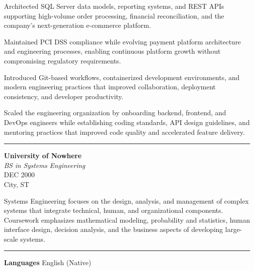 \documentclass[10pt]{article}
\newcommand{\sectionlabel}[1]{%
  \par\vspace{-8pt}%
  \noindent\textcolor{lightgray}{\rule{\textwidth}{0.3pt}}\par\vspace{-2pt}%
  \noindent{\bfseries\large #1}\par\vspace{-4pt}%
}
\newcommand{\edumeta}[4]{%
  \textbf{#2}\\[2pt]
  \textit{#1}\\[6pt]
  {\color{lighttext}#3}\\
  {\color{lighttext}#4}%
}
\begin{document}
\begin{entryrow}
\begin{resumeitems}
    \item Architected SQL Server data models, reporting systems, and REST APIs supporting high-volume order processing, financial reconciliation, and the company's next-generation e-commerce platform.
    \item Maintained PCI DSS compliance while evolving payment platform architecture and engineering processes, enabling continuous platform growth without compromising regulatory requirements.
    \item Introduced Git-based workflows, containerized development environments, and modern engineering practices that improved collaboration, deployment consistency, and developer productivity.
    \item Scaled the engineering organization by onboarding backend, frontend, and DevOps engineers while establishing coding standards, API design guidelines, and mentoring practices that improved code quality and accelerated feature delivery.
  \end{resumeitems}
\end{entryrow}

\sectionlabel{Education}

\begin{entryrow}
  {\edumeta
    {BS in Systems Engineering}
    {University of Nowhere}
    {DEC 2000}
    {City, ST}
  }
  Systems Engineering focuses on the design, analysis, and management of complex systems that integrate technical, human, and organizational components. Coursework emphasizes mathematical modeling, probability and statistics, human interface design, decision analysis, and the business aspects of developing large-scale systems.
\end{entryrow}

\par\vspace{-8pt}%
\noindent\textcolor{lightgray}{\rule{\textwidth}{0.3pt}}\par\vspace{-6pt}%
\begin{entryrow}{\bfseries\large Languages}
English (Native)
\end{entryrow}
\end{document}
